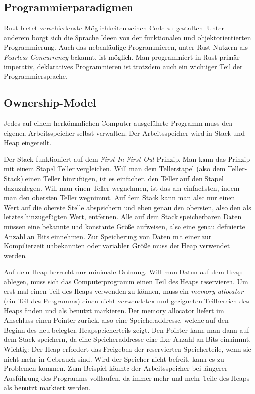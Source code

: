 \subsection{Programmierparadigmen}
Rust bietet verschiedenste Möglichkeiten seinen Code zu gestalten. Unter
anderem borgt sich die Sprache Ideen von der funktionalen und objektorientierten
Programmierung. Auch das nebenläufige Programmieren, unter Rust-Nutzern als
\textit{Fearless Concurrency} bekannt, ist möglich. Man programmiert in Rust
primär imperativ, deklaratives Programmieren ist trotzdem auch ein wichtiger
Teil der Programmiersprache.

\subsection{Ownership-Model}
Jedes auf einem herkömmlichen Computer ausgeführte Programm muss den eigenen Arbeitsspeicher selbst verwalten.
Der Arbeitsspeicher wird in Stack und Heap eingeteilt. \cite{rustlangbookownership1}

Der Stack funktioniert auf dem \textit{First-In-First-Out}-Prinzip. Man kann das Prinzip mit einem Stapel Teller vergleichen.
Will man dem Tellerstapel (also dem Teller-Stack) einen Teller hinzufügen, ist es einfacher,
den Teller auf den Stapel dazuzulegen. Will man einen Teller wegnehmen, ist das am einfachsten, indem man den obersten Teller wegnimmt.
Auf dem Stack kann man also nur einen Wert auf die oberste Stelle abspeichern und eben genau den obersten, also den als letztes hinzugefügten
Wert, entfernen. Alle auf dem Stack speicherbaren Daten müssen eine bekannte und konstante Größe aufweisen, also eine genau definierte Anzahl
an Bits einnehmen. Zur Speicherung von Daten mit einer zur Kompilierzeit unbekannten oder variablen Größe muss der Heap verwendet werden.

Auf dem Heap herrscht nur minimale Ordnung. Will man Daten auf dem Heap ablegen, muss sich das Computerprogramm einen Teil des Heaps
reservieren. Um erst mal einen Teil des Heaps verwenden zu können, muss ein \textit{memory allocator} (ein Teil des Programms) einen nicht
verwendeten und geeigneten Teilbereich des Heaps finden und als benutzt markieren. Der memory allocator liefert im Anschluss einen Pointer zurück,
also eine Speicheraddresse, welche auf den Beginn des neu belegten Heapspeicherteils zeigt. Den Pointer kann man dann auf dem Stack speichern, da eine
Speicheraddresse eine fixe Anzahl an Bits einnimmt. Wichtig: Der Heap erfordert das Freigeben der reservierten Speicherteile, wenn sie nicht
mehr in Gebrauch sind. Wird der Speicher nicht befreit, kann es zu Problemen kommen. Zum Beispiel könnte der Arbeitsspeicher bei längerer
Ausführung des Programms volllaufen, da immer mehr und mehr Teile des Heaps als benutzt markiert werden.

